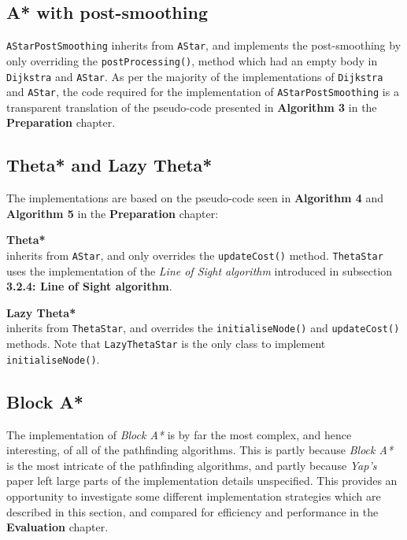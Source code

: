 \documentclass[12pt,notitlepage]{report}
\begin{document}
\subsection{A* with post-smoothing}

{\tt AStarPostSmoothing} inherits from {\tt AStar}, and implements the post-smoothing by only overriding the {\tt postProcessing()}, method which had an empty body in {\tt Dijkstra} and {\tt AStar}. As per the majority of the implementations of {\tt Dijkstra} and {\tt AStar}, the code required for the implementation of {\tt AStarPostSmoothing} is a transparent translation of the pseudo-code presented in {\bfseries Algorithm 3} in the {\bfseries Preparation} chapter.\\

\subsection {Theta* and Lazy Theta*}

The implementations are based on the pseudo-code seen in {\bfseries Algorithm 4} and {\bfseries Algorithm 5} in the {\bfseries Preparation} chapter: 
\begin{description}
\item{\bfseries Theta*}\\ \hfill inherits from {\tt AStar}, and only overrides the {\tt updateCost()} method. {\tt ThetaStar} uses the implementation of the {\em Line of Sight algorithm} introduced in subsection {\bfseries 3.2.4: Line of Sight algorithm}.
\item {\bfseries Lazy Theta*}\\ \hfill inherits from {\tt ThetaStar}, and overrides the {\tt initialiseNode()} and {\tt updateCost()} methods. Note that {\tt LazyThetaStar} is the only class to implement {\tt initialiseNode()}.
\end{description}

\subsection {Block A*}
The implementation of {\em Block A*} is by far the most complex, and hence interesting, of all of the pathfinding algorithms. This is partly because {\em Block A*} is the most intricate of the pathfinding algorithms, and partly because {\em Yap's} paper left large parts of the implementation details unspecified. This provides an opportunity to investigate some different implementation strategies which are described in this section, and compared for efficiency and performance in the {\bfseries Evaluation} chapter.\\
\end{document}
